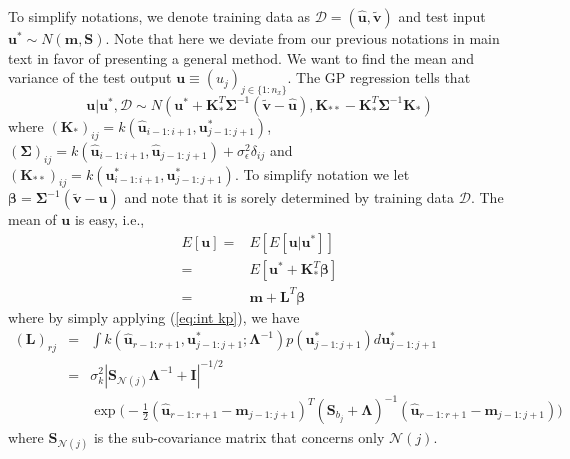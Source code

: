 \documentclass[smallextended,natbib]{svjour3}       %
\begin{document}
To simplify notations, we denote training data as $\mathcal{D}=(\hat{\mathbf{u}},\tilde{\mathbf{v}})$ and test input $\mathbf{u}^{*}\sim N(\mathbf{m},\mathbf{S})$. Note that here we deviate from our previous notations in main text in favor of presenting a general method. We want to find the mean and variance of the test output $\mathbf{u}\equiv(u_{j})_{j\in\{1:n_{x}\}}$. The GP regression tells that 
\[
\mathbf{u}\vert\mathbf{u}^{*},\mathcal{D}\sim N(\mathbf{u}^{*}+\mathbf{K}_{*}^{T}\mathbf{\boldsymbol{\Sigma}}^{-1}(\tilde{\mathbf{v}}-\hat{\mathbf{u}}),\mathbf{K}_{**}-\mathbf{K}_{*}^{T}\mathbf{\boldsymbol{\Sigma}}^{-1}\mathbf{K}_{*})
\]
where $(\mathbf{K}_{*})_{ij}=k(\hat{\mathbf{u}}_{i-1:i+1},\mathbf{u}_{j-1:j+1}^{*})$, $(\boldsymbol{\Sigma})_{ij}=k(\hat{\mathbf{u}}_{i-1:i+1},\hat{\mathbf{u}}_{j-1:j+1})+\sigma_{\epsilon}^{2}\delta_{ij}$ and $(\mathbf{K}_{**})_{ij}=k(\mathbf{u}_{i-1:i+1}^{*},\mathbf{u}_{j-1:j+1}^{*})$. To simplify notation we let $\boldsymbol{\beta}=\boldsymbol{\Sigma}^{-1}(\tilde{\mathbf{v}}-\hat{\mathbf{u}})$ and note that it is sorely determined by training data $\mathcal{D}$. The mean of $\mathbf{u}$ is easy, i.e., 
\begin{align}
E[\mathbf{u}] = & E[E[\mathbf{u}\vert\mathbf{u}^{*}]] \nonumber \\
 = & E[\mathbf{u}^{*}+\mathbf{K}_{*}^{T}\boldsymbol{\beta}] \nonumber \\
 = & \mathbf{m}+\mathbf{L}^{T}\boldsymbol{\beta}\label{eq:E(u)}
\end{align}
where by simply applying (\ref{eq:int kp}), we have
\begin{eqnarray*}
(\mathbf{L})_{rj} & = & \int k(\hat{\mathbf{u}}_{r-1:r+1},\mathbf{u}_{j-1:j+1}^{*};\boldsymbol{\Lambda}^{-1})p(\mathbf{u}_{j-1:j+1}^{*})d\mathbf{u}_{j-1:j+1}^{*} \\
 & = & \sigma_{k}^{2}\left|\mathbf{S}_{\mathcal{N}(j)}\boldsymbol{\Lambda}^{-1}+\mathbf{I}\right|^{-1/2} \\
 & & \exp\bigg(-\frac{1}{2}(\hat{\mathbf{u}}_{r-1:r+1}-\mathbf{m}_{j-1:j+1})^{T}(\mathbf{S}_{b_{j}}+\boldsymbol{\Lambda})^{-1}(\hat{\mathbf{u}}_{r-1:r+1}-\mathbf{m}_{j-1:j+1})\bigg) 
\end{eqnarray*}
where $\mathbf{S}_{\mathcal{N}(j)}$ is the sub-covariance matrix that concerns only $\mathcal{N}(j)$.
\end{document}
